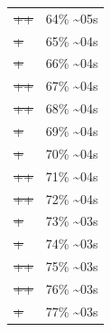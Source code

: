 \documentclass[12pt]{article}
\begin{document}
\begin{center}
\begin{tabular}{ll}
\sout{\sout{\sout{\sout{\sout{\sout{\sout{\sout{\sout{\sout{\sout{\sout{\sout{\sout{\sout{++}}}}}}}}}}}}}}} & 64\% \textasciitilde{}05s\\
\sout{\sout{\sout{\sout{\sout{\sout{\sout{\sout{\sout{\sout{\sout{\sout{\sout{\sout{\sout{\sout{+}}}}}}}}}}}}}}}} & 65\% \textasciitilde{}04s\\
\sout{\sout{\sout{\sout{\sout{\sout{\sout{\sout{\sout{\sout{\sout{\sout{\sout{\sout{\sout{\sout{+}}}}}}}}}}}}}}}} & 66\% \textasciitilde{}04s\\
\sout{\sout{\sout{\sout{\sout{\sout{\sout{\sout{\sout{\sout{\sout{\sout{\sout{\sout{\sout{\sout{++}}}}}}}}}}}}}}}} & 67\% \textasciitilde{}04s\\
\sout{\sout{\sout{\sout{\sout{\sout{\sout{\sout{\sout{\sout{\sout{\sout{\sout{\sout{\sout{\sout{++}}}}}}}}}}}}}}}} & 68\% \textasciitilde{}04s\\
\sout{\sout{\sout{\sout{\sout{\sout{\sout{\sout{\sout{\sout{\sout{\sout{\sout{\sout{\sout{\sout{\sout{+}}}}}}}}}}}}}}}}} & 69\% \textasciitilde{}04s\\
\sout{\sout{\sout{\sout{\sout{\sout{\sout{\sout{\sout{\sout{\sout{\sout{\sout{\sout{\sout{\sout{\sout{+}}}}}}}}}}}}}}}}} & 70\% \textasciitilde{}04s\\
\sout{\sout{\sout{\sout{\sout{\sout{\sout{\sout{\sout{\sout{\sout{\sout{\sout{\sout{\sout{\sout{\sout{++}}}}}}}}}}}}}}}}} & 71\% \textasciitilde{}04s\\
\sout{\sout{\sout{\sout{\sout{\sout{\sout{\sout{\sout{\sout{\sout{\sout{\sout{\sout{\sout{\sout{\sout{++}}}}}}}}}}}}}}}}} & 72\% \textasciitilde{}04s\\
\sout{\sout{\sout{\sout{\sout{\sout{\sout{\sout{\sout{\sout{\sout{\sout{\sout{\sout{\sout{\sout{\sout{\sout{+}}}}}}}}}}}}}}}}}} & 73\% \textasciitilde{}03s\\
\sout{\sout{\sout{\sout{\sout{\sout{\sout{\sout{\sout{\sout{\sout{\sout{\sout{\sout{\sout{\sout{\sout{\sout{+}}}}}}}}}}}}}}}}}} & 74\% \textasciitilde{}03s\\
\sout{\sout{\sout{\sout{\sout{\sout{\sout{\sout{\sout{\sout{\sout{\sout{\sout{\sout{\sout{\sout{\sout{\sout{++}}}}}}}}}}}}}}}}}} & 75\% \textasciitilde{}03s\\
\sout{\sout{\sout{\sout{\sout{\sout{\sout{\sout{\sout{\sout{\sout{\sout{\sout{\sout{\sout{\sout{\sout{\sout{++}}}}}}}}}}}}}}}}}} & 76\% \textasciitilde{}03s\\
\sout{\sout{\sout{\sout{\sout{\sout{\sout{\sout{\sout{\sout{\sout{\sout{\sout{\sout{\sout{\sout{\sout{\sout{\sout{+}}}}}}}}}}}}}}}}}}} & 77\% \textasciitilde{}03s\\

\end{tabular}
\end{center}
\end{document}
